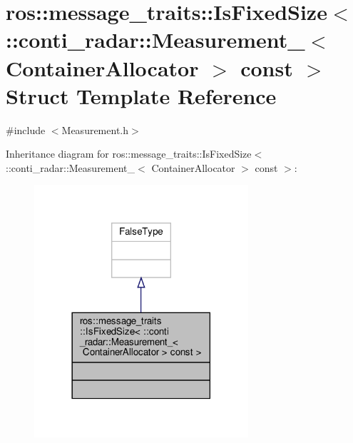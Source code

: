 \hypertarget{structros_1_1message__traits_1_1IsFixedSize_3_01_1_1conti__radar_1_1Measurement___3_01ContainerAllocator_01_4_01const_01_4}{}\section{ros\+:\+:message\+\_\+traits\+:\+:Is\+Fixed\+Size$<$ \+:\+:conti\+\_\+radar\+:\+:Measurement\+\_\+$<$ Container\+Allocator $>$ const $>$ Struct Template Reference}
\label{structros_1_1message__traits_1_1IsFixedSize_3_01_1_1conti__radar_1_1Measurement___3_01ContainerAllocator_01_4_01const_01_4}


{\ttfamily \#include $<$Measurement.\+h$>$}



Inheritance diagram for ros\+:\+:message\+\_\+traits\+:\+:Is\+Fixed\+Size$<$ \+:\+:conti\+\_\+radar\+:\+:Measurement\+\_\+$<$ Container\+Allocator $>$ const $>$\+:\nopagebreak
\begin{figure}[H]
\begin{center}
\leavevmode
\includegraphics[width=225pt]{d3/d9e/structros_1_1message__traits_1_1IsFixedSize_3_01_1_1conti__radar_1_1Measurement___3_01ContainerA7b9de5bcda02493717c807ad00247df5}
\end{center}
\end{figure}


